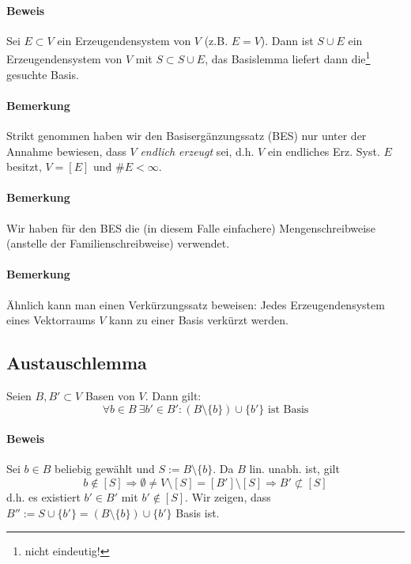  	\paragraph{Beweis}
 		Sei $E\subset V$ ein Erzeugendensystem von $V$ (z.B. $E=V$). Dann ist $S\cup E$ ein Erzeugendensystem von $V$ mit $S\subset S\cup E$, das Basislemma liefert dann die\footnote{nicht eindeutig!} gesuchte Basis.

 	\paragraph{Bemerkung}
 		Strikt genommen haben wir den Basisergänzungssatz (BES) nur unter der Annahme bewiesen, dass $V$ \emph{endlich erzeugt} sei, d.h. $V$ ein endliches Erz. Syst. $E$ besitzt, $V=[E]$ und $\#E<\infty$.

 	\paragraph{Bemerkung}
 		Wir haben für den BES die (in diesem Falle einfachere) Mengenschreibweise (anstelle der Familienschreibweise) verwendet.

 	\paragraph{Bemerkung}
 		Ähnlich kann man einen Verkürzungssatz beweisen: Jedes Erzeugendensystem eines Vektorraums $V$ kann zu einer Basis verkürzt werden.

 \subsection{Austauschlemma}
 	\begin{Lemma}[Austauschlemma]
 		Seien $B,B' \subset V$ Basen von $V$. Dann gilt:
 		\[
 			\forall b\in B\ \exists b' \in B': (B\setminus\{b\})\cup\{b'\} \text{ ist Basis}
 		\]
 	\end{Lemma}

 	\paragraph{Beweis}
 		Sei $b\in B$ beliebig gewählt und $S:= B\setminus \{b\}$. Da $B$ lin. unabh. ist, gilt
 		\[
 			b\notin [S] \Rightarrow \emptyset \neq V\setminus [S] = [B']\setminus [S] \Rightarrow B' \not\subset [S]
 		\]
 		d.h. es existiert $b' \in B'$ mit $b' \notin [S]$. Wir zeigen, dass $B'' := S\cup \{b'\} = (B\setminus\{b\})\cup \{b'\}$ Basis ist.

